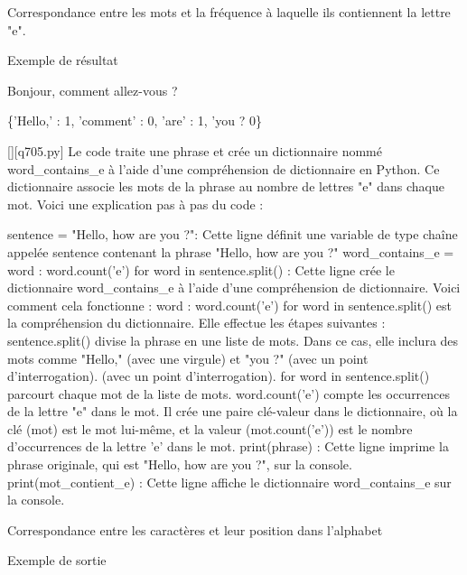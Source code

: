         \question
        Correspondance entre les mots et la fréquence à laquelle ils contiennent la lettre "e".

Exemple de résultat

Bonjour, comment allez-vous ?

\{'Hello,' : 1, 'comment' : 0, 'are' : 1, 'you ? 0\}
        \par
        \begin{solution}
            \renewcommand{\nomfichier}{q705.py}
            \pythonfile{\chemincode \nomfichier}[][\nomfichier]
            Le code traite une phrase et crée un dictionnaire nommé word_contains_e à l'aide d'une compréhension de dictionnaire en Python. Ce dictionnaire associe les mots de la phrase au nombre de lettres "e" dans chaque mot. Voici une explication pas à pas du code :

    sentence = "Hello, how are you ?": Cette ligne définit une variable de type chaîne appelée sentence contenant la phrase "Hello, how are you ?"
    word_contains_e = {word : word.count('e') for word in sentence.split()} : Cette ligne crée le dictionnaire word_contains_e à l'aide d'une compréhension de dictionnaire. Voici comment cela fonctionne :
        {word : word.count('e') for word in sentence.split()} est la compréhension du dictionnaire. Elle effectue les étapes suivantes :
        sentence.split() divise la phrase en une liste de mots. Dans ce cas, elle inclura des mots comme "Hello," (avec une virgule) et "you ?" (avec un point d'interrogation). (avec un point d'interrogation).
        for word in sentence.split() parcourt chaque mot de la liste de mots.
        word.count('e') compte les occurrences de la lettre "e" dans le mot.
        Il crée une paire clé-valeur dans le dictionnaire, où la clé (mot) est le mot lui-même, et la valeur (mot.count('e')) est le nombre d'occurrences de la lettre 'e' dans le mot.
    print(phrase) : Cette ligne imprime la phrase originale, qui est "Hello, how are you ?", sur la console.
    print(mot_contient_e) : Cette ligne affiche le dictionnaire word_contains_e sur la console.
        \end{solution}
        

        \question
        Correspondance entre les caractères et leur position dans l'alphabet

Exemple de sortie

